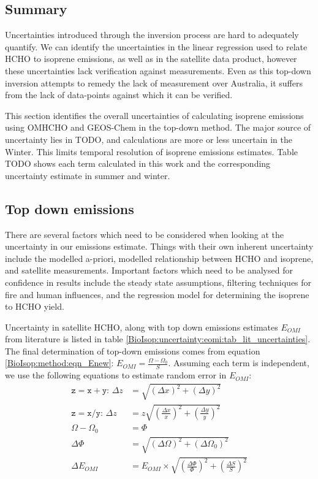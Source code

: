   \subsection{Summary}
    \label{BioIsop:uncertainty:summary}
    Uncertainties introduced through the inversion process are hard to adequately quantify. 
    We can identify the uncertainties in the linear regression used to relate HCHO to isoprene emissions, as well as in the satellite data product, however these uncertainties lack verification against measurements.
    Even as this top-down inversion attempts to remedy the lack of measurement over Australia, it suffers from the lack of data-points against which it can be verified.
    
    This section identifies the overall uncertainties of calculating isoprene emissions using OMHCHO and GEOS-Chem in the top-down method.
    The major source of uncertainty lies in TODO, and calculations are more or less uncertain in the Winter.
    This limits temporal resolution of isoprene emissions estimates.
    Table TODO shows each term calculated in this work and the corresponding uncertainty estimate in summer and winter.
  
  \subsection{Top down emissions}
    \label{BioIsop:uncertainty:eomi}
    There are several factors which need to be considered when looking at the uncertainty in our emissions estimate.
    Things with their own inherent uncertainty include the modelled a-priori, modelled relationship between HCHO and isoprene, and satellite measurements.
    Important factors which need to be analysed for confidence in results include the steady state assumptions, filtering techniques for fire and human influences, and the regression model for determining the isoprene to HCHO yield.
    
    Uncertainty in satellite HCHO, along with top down emissions estimates $E_{OMI}$ from literature is listed in table \ref{BioIsop:uncertainty:eomi:tab_lit_uncertainties}.
    The final determination of top-down emissions comes from equation \ref{BioIsop:method:eqn_Enew}: $E_{OMI}=\frac{\Omega - \Omega_{0}}{S}$.
    Assuming each term is independent, we use the following equations to estimate random error in $E_{OMI}$:
    \begin{align*}
      \mathtt{z=x+y:} \, \Delta{z} & = \sqrt{(\Delta{x})^2 + (\Delta{y})^2} \\
      \mathtt{z=x/y:} \, \Delta{z} & = z \sqrt{(\frac{\Delta{x}}{x})^2 + (\frac{\Delta{y}}{y})^2} \\
      \Omega - \Omega_{0} & = \Phi \\
      \Delta{\Phi} & = \sqrt{(\Delta{\Omega})^2 + (\Delta{\Omega_{0}})^2} \\
      \Delta{E_{OMI}} &= E_{OMI} \times \sqrt{(\frac{\Delta{\Phi}}{\Phi})^2 + (\frac{\Delta{S}}{S})^2}
    \end{align*}
    
